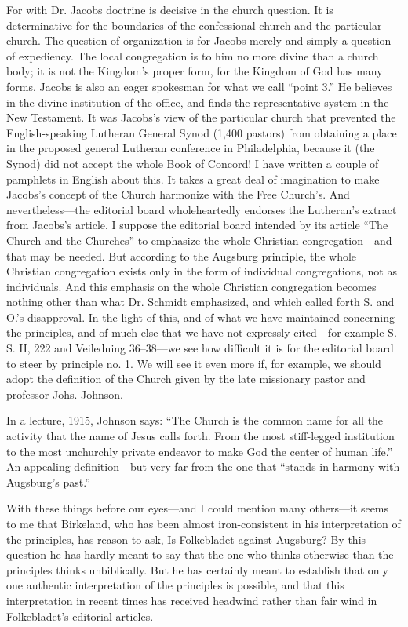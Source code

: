 For with Dr. Jacobs doctrine is decisive in the church question. It is determinative for the boundaries of the confessional church and the particular church. The question of organization is for Jacobs merely and simply a question of expediency. The local congregation is to him no more divine than a church body; it is not the Kingdom’s proper form, for the Kingdom of God has many forms. Jacobs is also an eager spokesman for what we call “point 3.” He believes in the divine institution of the office, and finds the representative system in the New Testament. It was Jacobs’s view of the particular church that prevented the English-speaking Lutheran General Synod (1,400 pastors) from obtaining a place in the proposed general Lutheran conference in Philadelphia, because it (the Synod) did not accept the whole Book of Concord! I have written a couple of pamphlets in English about this. It takes a great deal of imagination to make Jacobs’s concept of the Church harmonize with the Free Church’s. And nevertheless—the editorial board wholeheartedly endorses the Lutheran’s extract from Jacobs’s article. I suppose the editorial board intended by its article “The Church and the Churches” to emphasize the whole Christian congregation—and that may be needed. But according to the Augsburg principle, the whole Christian congregation exists only in the form of individual congregations, not as individuals. And this emphasis on the whole Christian congregation becomes nothing other than what Dr. Schmidt emphasized, and which called forth S. and O.’s disapproval. In the light of this, and of what we have maintained concerning the principles, and of much else that we have not expressly cited—for example S. S. II, 222 and Veiledning 36–38—we see how difficult it is for the editorial board to steer by principle no. 1. We will see it even more if, for example, we should adopt the definition of the Church given by the late missionary pastor and professor Johs. Johnson.

In a lecture, 1915, Johnson says: “The Church is the common name for all the activity that the name of Jesus calls forth. From the most stiff-legged institution to the most unchurchly private endeavor to make God the center of human life.” An appealing definition—but very far from the one that “stands in harmony with Augsburg’s past.”

With these things before our eyes—and I could mention many others—it seems to me that Birkeland, who has been almost iron-consistent in his interpretation of the principles, has reason to ask, Is Folkebladet against Augsburg? By this question he has hardly meant to say that the one who thinks otherwise than the principles thinks unbiblically. But he has certainly meant to establish that only one authentic interpretation of the principles is possible, and that this interpretation in recent times has received headwind rather than fair wind in Folkebladet’s editorial articles.

